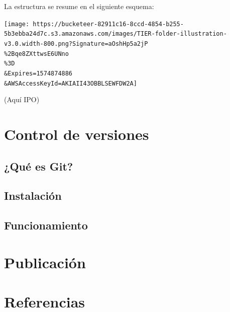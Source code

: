 \documentclass[
  11pt,
]{book}
\begin{document}
La estructura se resume en el siguiente esquema:

\texttt{[image: https://bucketeer-82911c16-8ccd-4854-b255-5b3ebba24d7c.s3.amazonaws.com/images/TIER-folder-illustration-v3.0.width-800.png?Signature=aOshHp5a2jP\\\%2Bqe8ZXttwsE6UNno\\\%3D\\\&Expires=1574874886\\\&AWSAccessKeyId=AKIAII43OBBLSEWFDW2A]}

(Aquí IPO)

\hypertarget{control-de-versiones}{%
\chapter{Control de versiones}\label{control-de-versiones}}

\hypertarget{quuxe9-es-git}{%
\section{¿Qué es Git?}\label{quuxe9-es-git}}

\hypertarget{instalaciuxf3n}{%
\section{Instalación}\label{instalaciuxf3n}}

\hypertarget{funcionamiento}{%
\section{Funcionamiento}\label{funcionamiento}}

\hypertarget{publicaciuxf3n}{%
\chapter{Publicación}\label{publicaciuxf3n}}

\hypertarget{referencias}{%
\chapter{Referencias}\label{referencias}}

  
\end{document}

